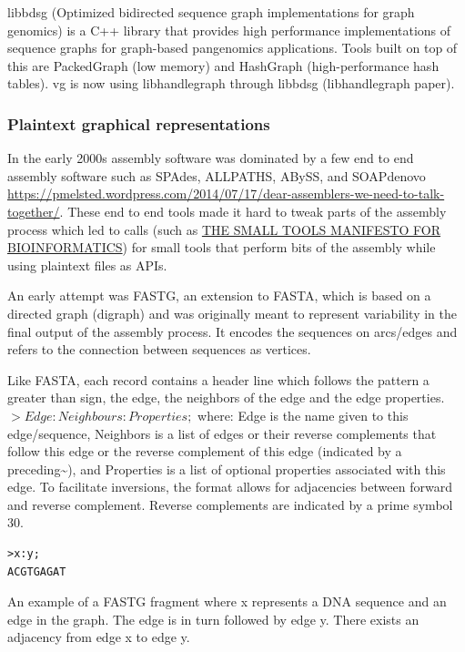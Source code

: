 \documentclass[a4paper]{article}
\begin{document}
libbdsg (Optimized bidirected sequence graph implementations for graph genomics)
is a C++ library that provides high performance implementations of sequence 
graphs for graph-based pangenomics applications. Tools built on top of this are
PackedGraph (low memory) and HashGraph (high-performance hash tables).
vg is now using libhandlegraph through libbdsg (libhandlegraph paper).

\subsubsection{Plaintext graphical representations}
\label{sec:org631da7e}
In the early 2000s assembly software was dominated by a few end to end assembly
software such as SPAdes, ALLPATHS, ABySS, and SOAPdenovo
\url{https://pmelsted.wordpress.com/2014/07/17/dear-assemblers-we-need-to-talk-together/}.
These end to end tools made it hard to tweak parts of the assembly process which
led to calls (such as \href{https://github.com/pjotrp/bioinformatics\#the-small-tools-manifesto-for-bioinformatics}{THE SMALL TOOLS MANIFESTO FOR BIOINFORMATICS}) for small
tools that perform bits of the assembly while using plaintext files as APIs.

An early attempt was FASTG,  an extension to FASTA, which is based on a directed
graph (digraph) and was originally meant to represent variability in the final
output of the assembly process.
It encodes the sequences on arcs/edges and refers to the connection
between sequences as vertices.

Like FASTA, each record contains a header line which follows the pattern
a greater than sign, the edge, the neighbors of the edge and the edge properties.
\(>Edge:Neighbours:Properties;\) where: Edge is the name given to this 
edge/sequence, Neighbors is a list of edges or their reverse complements that
follow this edge or the reverse complement of this edge
(indicated by a preceding\textasciitilde{}), and Properties is a list of optional properties 
associated with this edge. To facilitate
inversions, the format allows for adjacencies between forward and reverse
complement. Reverse complements are indicated by a prime symbol 30\textprime.


\begin{verbatim}
>x:y;
ACGTGAGAT
\end{verbatim}
An example of a FASTG fragment where x represents
a DNA sequence and an edge in the graph. The edge is in turn followed by edge y. 
There exists an adjacency from edge x to edge y.
\end{document}
